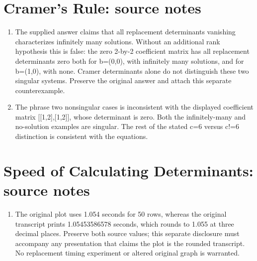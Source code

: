 \section*{Cramer’s Rule: source notes}
\begin{enumerate}
\item The supplied answer claims that all replacement determinants vanishing characterizes infinitely many solutions. Without an additional rank hypothesis this is false: the zero 2-by-2 coefficient matrix has all replacement determinants zero both for b=(0,0), with infinitely many solutions, and for b=(1,0), with none. Cramer determinants alone do not distinguish these two singular systems. Preserve the original answer and attach this separate counterexample.
\item The phrase two nonsingular cases is inconsistent with the displayed coefficient matrix [[1,2],[1,2]], whose determinant is zero. Both the infinitely-many and no-solution examples are singular. The rest of the stated c=6 versus c!=6 distinction is consistent with the equations.
\end{enumerate}
\section*{Speed of Calculating Determinants: source notes}
\begin{enumerate}
\item The original plot uses 1.054 seconds for 50 rows, whereas the original transcript prints 1.05453586578 seconds, which rounds to 1.055 at three decimal places. Preserve both source values; this separate disclosure must accompany any presentation that claims the plot is the rounded transcript. No replacement timing experiment or altered original graph is warranted.
\end{enumerate}

